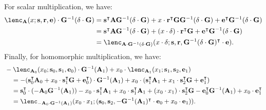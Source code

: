 \documentclass{article}
\begin{document}
For scalar multiplication, we have:
\begin{align*}
    \lenc_\mathbf{A} (x; \mathbf{s}, \mathbf{r}, \mathbf{e}) \cdot \mathbf{G}^{-1}(\delta\cdot \mathbf{G})
    &=\mathbf{s}^\intercal\mathbf{A} \mathbf{G}^{-1}(\delta\cdot \mathbf{G})+x\cdot\mathbf{r}^\intercal \mathbf{G} \mathbf{G}^{-1}(\delta\cdot \mathbf{G})+\mathbf{e}^\intercal \mathbf{G}^{-1}(\delta\cdot \mathbf{G})\\
    &=\mathbf{s}^\intercal\mathbf{A} \mathbf{G}^{-1}(\delta\cdot \mathbf{G})+(x\cdot\delta)\cdot\mathbf{r}^\intercal \mathbf{G} +\mathbf{e}^\intercal \mathbf{G}^{-1}(\delta\cdot \mathbf{G})\\
    &=\lenc_{\mathbf{A}\cdot \mathbf{G}^{-1}(\delta\cdot \mathbf{G})} (x\cdot \delta; \mathbf{s}, \mathbf{r}, \mathbf{G}^{-1}(\delta\cdot \mathbf{G})^\intercal\cdot\mathbf{e}).
\end{align*}
Finally, for homomorphic multiplication, we have:
\begin{align*}
    &-\lenc_{\mathbf{A}_0}(x_0; \mathbf{s}_0, \mathbf{s}_1, \mathbf{e}_0) \cdot \mathbf{G}^{-1}(\mathbf{A}_1)+x_0\cdot \lenc_{\mathbf{A}_1}(x_1; \mathbf{s}_1, \mathbf{s}_2, \mathbf{e}_1)\\
    &\quad=-(\mathbf{s}_0^\intercal\mathbf{A}_0+x_0\cdot\mathbf{s}_1^\intercal \mathbf{G}+\mathbf{e}_0^\intercal)\cdot\mathbf{G}^{-1}(\mathbf{A}_1)+x_0\cdot (\mathbf{s}_1^\intercal\mathbf{A}_1+x_1\cdot\mathbf{s}_2^\intercal \mathbf{G}+ \mathbf{e}_1^\intercal)\\
    &\quad=\mathbf{s}_0^\intercal\cdot(-\mathbf{A}_0\mathbf{G}^{-1}(\mathbf{A}_1))-x_0\cdot \mathbf{s}_1^\intercal\mathbf{A}_1+x_0\cdot \mathbf{s}_1^\intercal\mathbf{A}_1+(x_0\cdot x_1)\cdot\mathbf{s}_2^\intercal \mathbf{G}-\mathbf{e}_0^\intercal\mathbf{G}^{-1}(\mathbf{A}_1)+x_0\cdot \mathbf{e}_1^\intercal\\
    &\quad=\lenc_{-\mathbf{A}_0\cdot \mathbf{G}^{-1}(\mathbf{A}_1)}(x_0\cdot x_1; (\mathbf{s}_0, \mathbf{s}_2, -\mathbf{G}^{-1}(\mathbf{A}_1)^\intercal\cdot \mathbf{e}_0+x_0\cdot\mathbf{e}_1)).
\end{align*}
\end{document}
